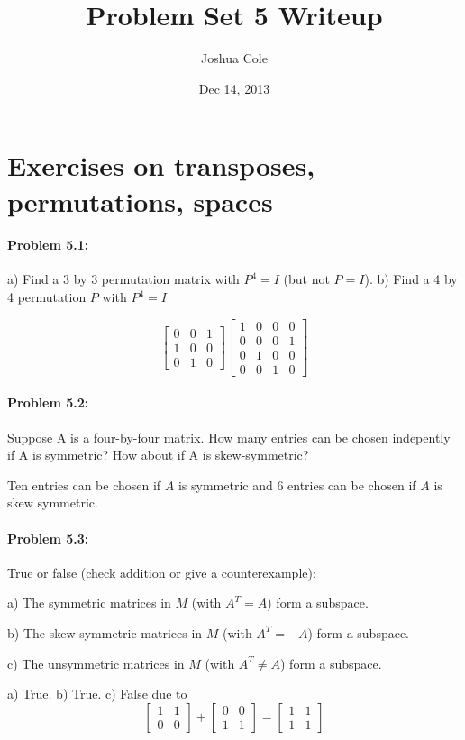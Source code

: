 \documentclass {article}
\begin{document}
\title {Problem Set 5 Writeup}
\author {Joshua Cole}
\date {Dec 14, 2013}
\maketitle
\section {Exercises on transposes, permutations, spaces}

\paragraph{Problem 5.1:}

a) Find a 3 by 3 permutation matrix with $P^4 = I$ (but not $P = I$). b) Find a 4 by 4 permutation $P$ with $P^4= I$

$$
\begin{bmatrix}
0 & 0 & 1 \\
1 & 0 & 0 \\
0 & 1 & 0
\end{bmatrix}
\begin{bmatrix}
1 & 0 & 0 & 0 \\
0 & 0 & 0 & 1 \\
0 & 1 & 0 & 0 \\
0 & 0 & 1 & 0
\end{bmatrix}
$$


\paragraph{Problem 5.2:} Suppose A is a four-by-four matrix. How many entries can be chosen indepently if A is symmetric? How about if A is skew-symmetric?

Ten entries can be chosen if $A$ is symmetric and 6 entries can be chosen if $A$ is skew symmetric.

\paragraph{Problem 5.3:} True or false (check addition or give a counterex­ample):

a) The symmetric matrices in $M$ (with $A^T = A$) form a subspace.

b) The skew-symmetric matrices in $M$ (with $A^T = −A$) form a subspace.

c) The unsymmetric matrices in $M$ (with $A^T \ne A$) form a subspace.

a) True. b) True. c) False due to 
$$
\begin{bmatrix}
1 & 1 \\
0 & 0 
\end{bmatrix} +
\begin{bmatrix}
0 & 0 \\
1 & 1 
\end{bmatrix}
=
\begin{bmatrix}
1 & 1 \\
1 & 1 
\end{bmatrix}
$$
\end{document}
